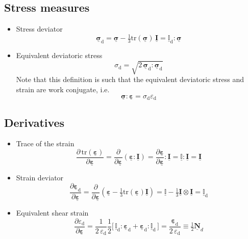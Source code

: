 \documentclass[times,namecite]{goose-article}
\newcommand\T[1]{\underline{\bm{{#1}}}}
\newcommand\TT[1]{\underline{\mathbb{{#1}}}}
\begin{document}
\subsection{Stress measures}
\label{sec:nomenclature::stress}

\begin{itemize}
%
\item Stress deviator
%
\begin{equation}
  \T{\sigma}_\mathrm{d}
  = \T{\sigma} - \tfrac{1}{3} \text{tr} ( \T{\sigma} ) \, \T{I}
  = \TT{I}_\mathrm{d} : \T{\sigma}
\end{equation}
%
\item Equivalent deviatoric stress
\begin{equation}
\sigma_\mathrm{d} = \sqrt{ 2 \, \T{\sigma}_\mathrm{d} : \T{\sigma}_\mathrm{d} }
\end{equation}
Note that this definition is such that the equivalent deviatoric stress and strain are work conjugate, i.e.
\begin{equation}
  \T{\sigma} : \T{\varepsilon} = \sigma_\mathrm{d} \varepsilon_\mathrm{d}
\end{equation}
%
\end{itemize}

\subsection{Derivatives}
\label{sec:nomenclature:derivatives}

\begin{itemize}
%
\item Trace of the strain
\begin{equation}
  \frac{ \partial \, \text{tr} ( \T{\varepsilon} ) }{ \partial \T{\varepsilon} }
  =
  \frac{ \partial }{ \partial \T{\varepsilon} } \left( \T{\varepsilon} : \T{I} \right)
  =
  \frac{ \partial \T{\varepsilon} }{ \partial \T{\varepsilon} } : \T{I}
  =
  \TT{I} : \T{I}
  =
  \T{I}
\end{equation}
%
\item Strain deviator
\begin{equation}
  \frac{ \partial \T{\varepsilon}_\mathrm{d} }{ \partial \T{\varepsilon} }
  =
  \frac{ \partial }{ \partial \T{\varepsilon} } \left( \T{\varepsilon} - \tfrac{1}{3} \text{tr} ( \T{\varepsilon} ) \T{I} \right)
  =
  \TT{I} - \tfrac{1}{3} \T{I} \otimes \T{I}
  =
  \TT{I}_\mathrm{d}
\end{equation}
%
\item Equivalent shear strain
\begin{equation}
  \frac{ \partial \varepsilon_\mathrm{d} }{ \partial \T{\varepsilon} }
  =
  \frac{1}{2 \, \varepsilon_\mathrm{d}} \frac{1}{2}
  \big[\, \TT{I}_\mathrm{d} : \T{\varepsilon}_\mathrm{d} + \T{\varepsilon}_\mathrm{d} : \TT{I}_\mathrm{d} \,\big]
  =
  \frac{\T{\varepsilon}_\mathrm{d}}{2 \, \varepsilon_\mathrm{d}}
  \equiv
  \tfrac{1}{2} \T{N}_d
\end{equation}
%
\end{itemize}
\end{document}
